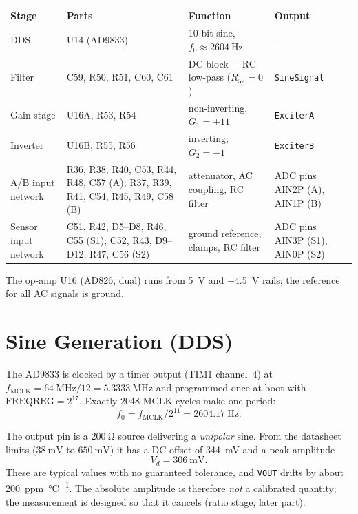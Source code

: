\documentclass[11pt,a4paper]{article}
\begin{document}
\begin{center}
\small
\begin{tabular}{@{}lp{4.6cm}p{3.6cm}p{2.6cm}@{}}
\toprule
Stage & Parts & Function & Output \\
\midrule
DDS        & U14 (AD9833)     & 10-bit sine, $f_0 \approx \SI{2604}{\hertz}$ & --- \\
Filter     & C59, R50, R51, C60, C61 & DC block + RC low-pass ($R_{52}=0$) & \texttt{SineSignal} \\
Gain stage & U16A, R53, R54   & non-inverting, $G_1 = +11$ & \texttt{ExciterA} \\
Inverter   & U16B, R55, R56   & inverting, $G_2 = -1$      & \texttt{ExciterB} \\
A/B input network & R36, R38, R40, C53, R44, R48, C57 (A); R37, R39, R41, C54, R45, R49, C58 (B)
           & attenuator, AC coupling, RC filter & ADC pins AIN2P (A), AIN1P (B) \\
Sensor input network & C51, R42, D5--D8, R46, C55 (S1); C52, R43, D9--D12, R47, C56 (S2)
           & ground reference, clamps, RC filter & ADC pins AIN3P (S1), AIN0P (S2) \\
\bottomrule
\end{tabular}
\end{center}

The op-amp U16 (AD826, dual) runs from \SI{+5}{\volt} and \SI{-4.5}{\volt}
rails; the reference for all AC signals is ground.

\section{Sine Generation (DDS)}

The AD9833 is clocked by a timer output (TIM1 channel~4) at
$f_{\mathrm{MCLK}} = \SI{64}{\mega\hertz}/12 = \SI{5.3333}{\mega\hertz}$
and programmed once at boot with $\mathrm{FREQREG}=2^{17}$.  Exactly 2048
MCLK cycles make one period:
\begin{equation}
  \boxed{f_0 = f_{\mathrm{MCLK}}/2^{11} = \SI{2604.17}{\hertz}.}
  \label{eq:f0}
\end{equation}

The output pin is a $\SI{200}{\ohm}$ source delivering a \emph{unipolar}
sine.  From the datasheet limits ($\SI{38}{\milli\volt}$ to
$\SI{650}{\milli\volt}$) it has a DC offset of \SI{344}{\milli\volt} and a
peak amplitude
\begin{equation}
  V_d = \SI{306}{\milli\volt}.
\end{equation}
These are typical values with no guaranteed tolerance, and \texttt{VOUT}
drifts by about \SI{200}{ppm\per\celsius}.  The absolute amplitude is
therefore \emph{not} a calibrated quantity; the measurement is designed so
that it cancels (ratio stage, later part).
\end{document}
